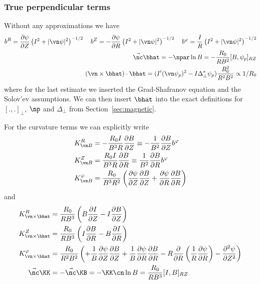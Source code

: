 \subsubsection{True perpendicular terms} \label{sec:trueapprox}

Without any approximations we have
\begin{align}
b^R = {\frac{\partial \psi}{\partial Z}}\left(I^2+|\vn\psi|^2\right)^{-1/2} \quad
b^Z = -{\frac{\partial \psi}{\partial R}}\left(I^2+|\vn\psi|^2\right)^{-1/2} \quad 
b^\varphi = \frac{I}{R}\left(I^2+|\vn\psi|^2\right)^{-1/2} \\
\vec\nc\bhat = -\npar \ln B = -\frac{R_0}{R B^2}[B,\psi_p]_{RZ} \\
\left({\vn\times\bhat}\right) \cdot\bhat =
    (I'(\vn\psi_p)^2 - I \Delta_\perp^* \psi_p)\frac{ R_0^2}{R^2B^2} \propto 1/R_0
\label{}
\end{align}
where for the last
estimate we inserted the Grad-Shafranov equation and the Solov'ev assumptions.
We can then insert $\bhat$ into the exact definitions for $[.,.]_\perp$, $\np$ and $\Delta_\perp$ from Section~\ref{sec:magnetic}.

For the curvature terms we can explicitly write
\begin{align}
K_{\vn B}^R &= -\frac{R_0 I}{B^3R}\frac{\partial B}{\partial Z} \equiv -\frac{1}{B^2}\frac{\partial B}{\partial Z}b^\varphi \\
K_{\vn B}^Z &= \frac{R_0 I}{B^3R}\frac{\partial B}{\partial R}\equiv \frac{1}{B^2}\frac{\partial B}{\partial R}b^\varphi \\
K_{\vn B}^\varphi &= \frac{R_0}{B^3R^2}\left(
      \frac{\partial \psi}{\partial Z} \frac{\partial B}{\partial Z}
    + \frac{\partial \psi}{\partial R}\frac{\partial B}{\partial R}\right)
\label{}
\end{align}
and
\begin{align}
K_{\vn\times\bhat}^R &= \frac{R_0 }{RB^3}\left( B\frac{\partial I}{\partial Z} -I\frac{\partial B}{\partial Z}\right) \\
K_{\vn\times\bhat}^Z &= \frac{R_0 }{RB^3} \left( I\frac{\partial B}{\partial R} - B\frac{\partial I}{\partial R} \right)\\
K_{\vn\times\bhat}^\varphi &= \frac{R_0}{R^2B^2}\left(
+ \frac{1}{B}\frac{\partial\psi}{\partial Z} \frac{\partial B}{\partial Z}
+ \frac{1}{B}\frac{\partial \psi}{\partial R}\frac{\partial B}{\partial R}
-R\frac{\partial}{\partial R}\left(\frac{1}{R}\frac{\partial\psi}{\partial R}\right) 
- \frac{\partial^2 \psi}{\partial Z^2}
\right) \\
\vec\nc\KK &= -\vec\nc\KB= -\KK\cn\ln B = \frac{R_0}{RB^3}[I,B]_{RZ}
\label{}
\end{align}

